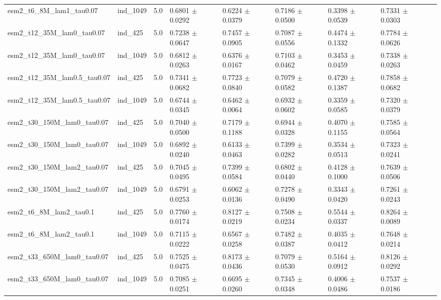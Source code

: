 \begin{table}[ht]
\begin{tabular}{lllllllll}
esm2\_t6\_8M\_lam1\_tau0.07 & ind\_1049 & 5.0 & 0.6801 $\pm$ 0.0292 & 0.6224 $\pm$ 0.0379 & 0.7186 $\pm$ 0.0500 & 0.3398 $\pm$ 0.0539 & 0.7331 $\pm$ 0.0303 &  \\
esm2\_t12\_35M\_lam0\_tau0.07 & ind\_425 & 5.0 & 0.7238 $\pm$ 0.0647 & 0.7457 $\pm$ 0.0905 & 0.7087 $\pm$ 0.0556 & 0.4474 $\pm$ 0.1332 & 0.7784 $\pm$ 0.0626 &  \\
esm2\_t12\_35M\_lam0\_tau0.07 & ind\_1049 & 5.0 & 0.6812 $\pm$ 0.0263 & 0.6376 $\pm$ 0.0167 & 0.7103 $\pm$ 0.0462 & 0.3453 $\pm$ 0.0459 & 0.7338 $\pm$ 0.0263 &  \\
esm2\_t12\_35M\_lam0.5\_tau0.07 & ind\_425 & 5.0 & 0.7341 $\pm$ 0.0682 & 0.7723 $\pm$ 0.0840 & 0.7079 $\pm$ 0.0582 & 0.4720 $\pm$ 0.1387 & 0.7858 $\pm$ 0.0682 &  \\
esm2\_t12\_35M\_lam0.5\_tau0.07 & ind\_1049 & 5.0 & 0.6744 $\pm$ 0.0345 & 0.6462 $\pm$ 0.0064 & 0.6932 $\pm$ 0.0602 & 0.3359 $\pm$ 0.0585 & 0.7320 $\pm$ 0.0379 &  \\
esm2\_t30\_150M\_lam0\_tau0.07 & ind\_425 & 5.0 & 0.7040 $\pm$ 0.0500 & 0.7179 $\pm$ 0.1188 & 0.6944 $\pm$ 0.0328 & 0.4070 $\pm$ 0.1155 & 0.7585 $\pm$ 0.0564 &  \\
esm2\_t30\_150M\_lam0\_tau0.07 & ind\_1049 & 5.0 & 0.6892 $\pm$ 0.0240 & 0.6133 $\pm$ 0.0463 & 0.7399 $\pm$ 0.0282 & 0.3534 $\pm$ 0.0513 & 0.7323 $\pm$ 0.0241 &  \\
esm2\_t30\_150M\_lam2\_tau0.07 & ind\_425 & 5.0 & 0.7045 $\pm$ 0.0495 & 0.7399 $\pm$ 0.0584 & 0.6802 $\pm$ 0.0440 & 0.4128 $\pm$ 0.1000 & 0.7639 $\pm$ 0.0506 &  \\
esm2\_t30\_150M\_lam2\_tau0.07 & ind\_1049 & 5.0 & 0.6791 $\pm$ 0.0253 & 0.6062 $\pm$ 0.0136 & 0.7278 $\pm$ 0.0490 & 0.3343 $\pm$ 0.0420 & 0.7261 $\pm$ 0.0243 &  \\
esm2\_t6\_8M\_lam2\_tau0.1 & ind\_425 & 5.0 & 0.7760 $\pm$ 0.0174 & 0.8127 $\pm$ 0.0219 & 0.7508 $\pm$ 0.0234 & 0.5544 $\pm$ 0.0337 & 0.8264 $\pm$ 0.0089 &  \\
esm2\_t6\_8M\_lam2\_tau0.1 & ind\_1049 & 5.0 & 0.7115 $\pm$ 0.0222 & 0.6567 $\pm$ 0.0258 & 0.7482 $\pm$ 0.0387 & 0.4035 $\pm$ 0.0412 & 0.7648 $\pm$ 0.0214 &  \\
esm2\_t33\_650M\_lam0\_tau0.07 & ind\_425 & 5.0 & 0.7525 $\pm$ 0.0475 & 0.8173 $\pm$ 0.0436 & 0.7079 $\pm$ 0.0530 & 0.5164 $\pm$ 0.0912 & 0.8126 $\pm$ 0.0292 &  \\
esm2\_t33\_650M\_lam0\_tau0.07 & ind\_1049 & 5.0 & 0.7085 $\pm$ 0.0251 & 0.6695 $\pm$ 0.0260 & 0.7345 $\pm$ 0.0348 & 0.4006 $\pm$ 0.0486 & 0.7537 $\pm$ 0.0186 &  \\

\end{tabular}
\end{table}

